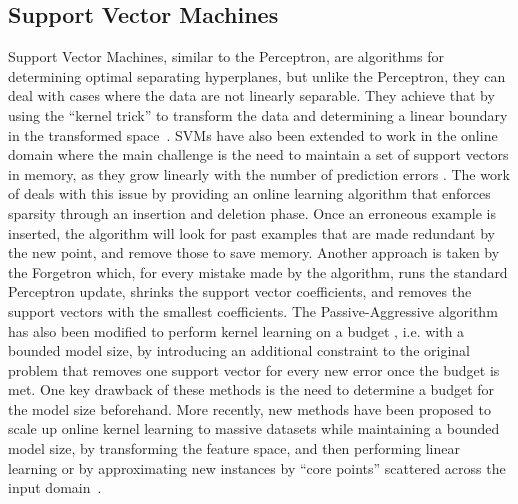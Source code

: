 \subsection*{Support Vector Machines}
Support Vector Machines, similar to the Perceptron, are algorithms for determining
optimal separating hyperplanes, but unlike the Perceptron, they can deal with
cases where the data are not linearly separable. They achieve that by using the
``kernel trick'' to transform the data and determining a linear boundary in
the transformed space~\cite{esl}.
SVMs have also
been extended to work in the online domain \cite{online-kernels}
where the main challenge is the need to maintain a set of support vectors
in memory, as they grow linearly with the number of prediction errors
\cite{budget-classification}. The work of \citet{budget-classification}
deals with this issue by providing an online learning algorithm
that enforces sparsity through an insertion and deletion phase.
Once an erroneous example is inserted, the algorithm will look
for past examples that are made redundant by the new point,
and remove those to save memory.
Another approach is taken by the Forgetron \cite{forgetron} which,
for every mistake made by the algorithm, runs the standard
Perceptron update, shrinks the support vector coefficients, and removes
the support vectors with the smallest coefficients.
The Passive-Aggressive algorithm has also been modified
to perform kernel learning on a budget \cite{pa-budget},
i.e. with a bounded model size, by introducing an additional
constraint to the original problem that removes one support
vector for every new error once the budget is met.
One key drawback of these methods
is the need to determine a budget for the model size beforehand.
More recently, new methods have been proposed to scale up
online kernel learning to massive datasets while maintaining a bounded model size,
by transforming the feature space, and then performing linear learning \cite{large-online-kernels}
or by approximating new instances by ``core points''
scattered across the input domain~\cite{approximation-vm}.

